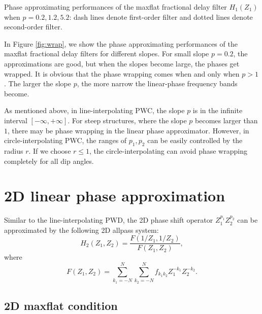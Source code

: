 {Phase approximating performances of the maxflat fractional delay 
filter $H_1(Z_1)$ when $p=0.2,1.2,5.2$:
dash lines denote first-order filter and dotted lines denote second-order filter.}


In Figure \ref{fig:wrap}, we show the phase approximating performances
of the maxflat fractional delay filters for different slopes.  For
small slope $p=0.2$, the approximations are good, but when the slopes
become large, the phases get wrapped.  It is obvious
that the phase wrapping comes when and only when $p>1$.  The larger
the slope $p$, the more narrow
the linear-phase frequency bands become. 

As mentioned above, in line-interpolating PWC,
the slope $p$ is in the infinite interval $[-\infty,+\infty]$.
For steep structures, 
where the slope $p$ becomes larger than $1$, 
there may be phase wrapping in the linear phase approximator.
However, in circle-interpolating PWC,
the ranges of $p_1,p_2$ can be easily controlled by the radius $r$.
If we choose $r\leq 1$, 
the circle-interpolating can avoid phase wrapping completely for all dip angles.

\section{2D linear phase approximation}

Similar to the line-interpolating PWD,
the 2D phase shift operator $Z_1^{p_1}Z_2^{p_2}$
can be approximated by the following 2D allpass system:
\begin{equation}
H_2(Z_1,Z_2)=
\frac{F(1/Z_1,1/Z_2)}{F(Z_1,Z_2)},
\end{equation}
where 
\begin{equation}
F(Z_1,Z_2)=
\sum_{k_1=-N}^N\sum_{k_2=-N}^N
f_{k_1k_2}Z_1^{-k_1}Z_2^{-k_2}.
\end{equation}



\subsection{2D maxflat condition}

